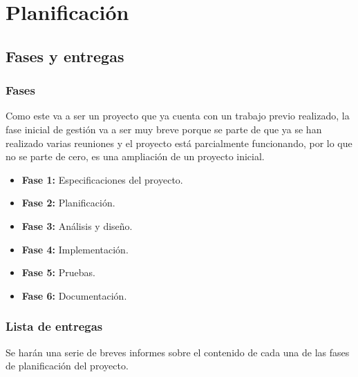 \chapter{Planificación}

\section{Fases y entregas}

\subsection{Fases}

Como este va a ser un proyecto que ya cuenta con un trabajo previo realizado, la fase inicial de gestión va a ser muy breve porque se parte de que ya se han realizado varias reuniones y el proyecto está parcialmente funcionando, por lo que no se parte de cero, es una ampliación de un proyecto inicial.

\begin{itemize}
  \item \textbf{Fase 1:} Especificaciones del proyecto.
  \item \textbf{Fase 2:} Planificación.
  \item \textbf{Fase 3:} Análisis y diseño.
  \item \textbf{Fase 4:} Implementación.
  \item \textbf{Fase 5:} Pruebas.
  \item \textbf{Fase 6:} Documentación.
\end{itemize}

\subsection{Lista de entregas}

Se harán una serie de breves informes sobre el contenido de cada una de las fases de planificación del proyecto.

